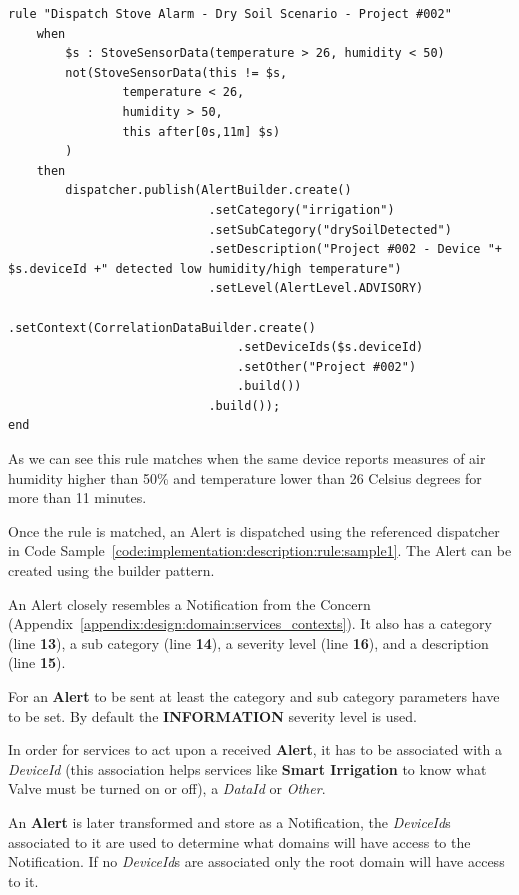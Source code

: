 \begin{lstlisting}[style=drools, caption=Rule Scenario Example - Part 3, label={code:implementation:description:rule:sample3}]
rule "Dispatch Stove Alarm - Dry Soil Scenario - Project #002"
    when
        $s : StoveSensorData(temperature > 26, humidity < 50)
        not(StoveSensorData(this != $s,
                temperature < 26,
                humidity > 50,
                this after[0s,11m] $s)
        )
    then
        dispatcher.publish(AlertBuilder.create()
                            .setCategory("irrigation")
                            .setSubCategory("drySoilDetected")
                            .setDescription("Project #002 - Device "+ $s.deviceId +" detected low humidity/high temperature")
                            .setLevel(AlertLevel.ADVISORY)
                            .setContext(CorrelationDataBuilder.create()
                                .setDeviceIds($s.deviceId)
                                .setOther("Project #002")
                                .build())
                            .build());
end
\end{lstlisting}

As we can see this rule matches when the same device reports measures of air humidity higher than 50\% and temperature lower than 26 Celsius degrees for more than 11 minutes.

Once the rule is matched, an Alert is dispatched using the referenced dispatcher in Code Sample~\ref{code:implementation:description:rule:sample1}. The Alert can be created using the builder pattern.

An Alert closely resembles a Notification from the  Concern  (Appendix~\ref{appendix:design:domain:services_contexts}). It also has a category (line \textbf{13}), a sub category (line \textbf{14}), a severity level (line \textbf{16}), and a description (line \textbf{15}).

For an \textbf{Alert} to be sent at least the category and sub category parameters have to be set. By default the \textbf{INFORMATION} severity level is used.

In order for services to act upon a received \textbf{Alert}, it has to be associated with a \textit{DeviceId} (this association helps services like \textbf{Smart Irrigation} to know what Valve must be turned on or off), a \textit{DataId} or \textit{Other}.

An \textbf{Alert} is later transformed and store as a Notification, the \textit{DeviceId}s associated to it are used to determine what domains will have access to the Notification. If no \textit{DeviceId}s are associated only the root domain will have access to it.

